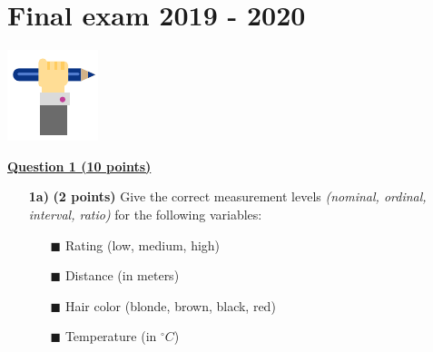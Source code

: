 
\begin{minipage}{0.8\textwidth}
\section{Final exam 2019 - 2020}
\end{minipage}%
\hfill%
\begin{minipage}{0.1\textwidth}
\includegraphics[width=\linewidth]{Files/Images/pencilhand.pdf}
\end{minipage}
\vspace*{.1cm}

\underline{\textbf{Question 1 (10 points)}} \\

\begin{itemize}

\item[\textbf{1a)}] \textbf{(2 points)} Give the correct measurement levels \textit{(nominal, ordinal, interval, ratio)} for the following variables: 
\begin{itemize}
\item[$\blacksquare$] Rating (low, medium, high)
\item[$\blacksquare$] Distance (in meters)
\item[$\blacksquare$] Hair color (blonde, brown, black, red)
\item[$\blacksquare$] Temperature (in $^{\circ} C$) 
\end{itemize}
\end{itemize}

